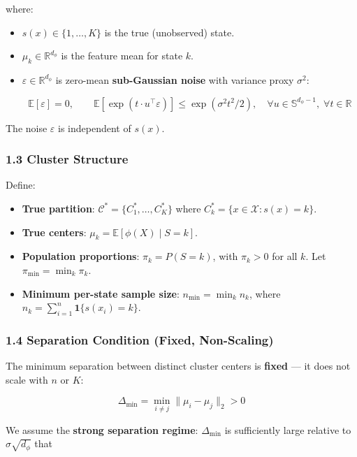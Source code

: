 \documentclass[
  12pt,
]{ctexart}
\providecommand{\tightlist}{%
  \setlength{\itemsep}{0pt}\setlength{\parskip}{0pt}}
\begin{document}
where:

\begin{itemize}
\item
  \(s(x) \in \{1, \dots, K\}\) is the true (unobserved) state.
\item
  \(\mu_k \in \mathbb{R}^{d_\phi}\) is the feature mean for state \(k\).
\item
  \(\varepsilon \in \mathbb{R}^{d_\phi}\) is zero-mean
  \textbf{sub-Gaussian noise} with variance proxy \(\sigma^2\):

  \[\mathbb{E}[\varepsilon] = 0, \qquad
    \mathbb{E}[\exp(t \cdot u^\top \varepsilon)] \leq \exp(\sigma^2 t^2 / 2),
    \quad \forall u \in \mathbb{S}^{d_\phi-1}, \; \forall t \in \mathbb{R}\]
\end{itemize}

The noise \(\varepsilon\) is independent of \(s(x)\).

\subsubsection{1.3 Cluster Structure}\label{cluster-structure}

Define:

\begin{itemize}
\tightlist
\item
  \textbf{True partition}: \(\mathcal{C}^* = \{C_1^*, \dots, C_K^*\}\)
  where \(C_k^* = \{x \in \mathcal{X} : s(x) = k\}\).
\item
  \textbf{True centers}: \(\mu_k = \mathbb{E}[\phi(X) \mid S = k]\).
\item
  \textbf{Population proportions}: \(\pi_k = P(S = k)\), with
  \(\pi_k > 0\) for all \(k\). Let \(\pi_{\min} = \min_k \pi_k\).
\item
  \textbf{Minimum per-state sample size}: \(n_{\min} = \min_k n_k\),
  where \(n_k = \sum_{i=1}^n \mathbf{1}\{s(x_i) = k\}\).
\end{itemize}

\subsubsection{1.4 Separation Condition (Fixed,
Non-Scaling)}\label{separation-condition-fixed-non-scaling}

The minimum separation between distinct cluster centers is
\textbf{fixed} --- it does not scale with \(n\) or \(K\):

\[\Delta_{\min} = \min_{i \neq j} \|\mu_i - \mu_j\|_2 > 0\]

We assume the \textbf{strong separation regime}: \(\Delta_{\min}\) is
sufficiently large relative to \(\sigma \sqrt{d_\phi}\) that
\end{document}
